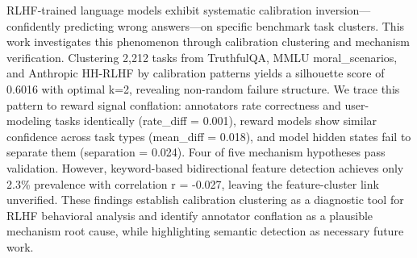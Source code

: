 
RLHF-trained language models exhibit systematic calibration inversion---confidently predicting wrong answers---on specific benchmark task clusters. This work investigates this phenomenon through calibration clustering and mechanism verification. Clustering 2,212 tasks from TruthfulQA, MMLU moral\_scenarios, and Anthropic HH-RLHF by calibration patterns yields a silhouette score of 0.6016 with optimal k=2, revealing non-random failure structure. We trace this pattern to reward signal conflation: annotators rate correctness and user-modeling tasks identically (rate\_diff = 0.001), reward models show similar confidence across task types (mean\_diff = 0.018), and model hidden states fail to separate them (separation = 0.024). Four of five mechanism hypotheses pass validation. However, keyword-based bidirectional feature detection achieves only 2.3\% prevalence with correlation r = -0.027, leaving the feature-cluster link unverified. These findings establish calibration clustering as a diagnostic tool for RLHF behavioral analysis and identify annotator conflation as a plausible mechanism root cause, while highlighting semantic detection as necessary future work.
